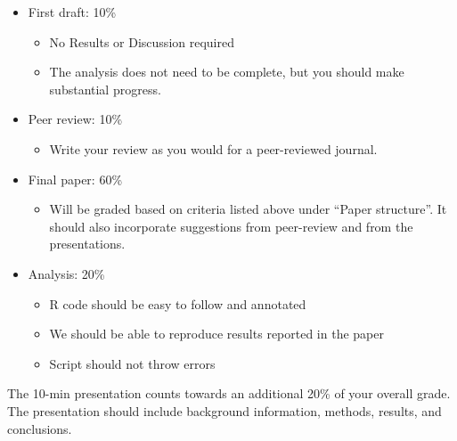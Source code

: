 \documentclass[12pt]{article}
\begin{document}
\begin{itemize}
  \item First draft: 10\%
    \begin{itemize}
      \item No Results or Discussion required
      \item The analysis does not need to be complete, but you should make substantial progress.
    \end{itemize}
  \item Peer review: 10\%
    \begin{itemize}
      \item Write your review as you would for a peer-reviewed journal.
    \end{itemize}
  \item Final paper: 60\%
    \begin{itemize}
      \item Will be graded based on criteria listed above under
        ``Paper structure''. It should also incorporate suggestions from
        peer-review and from the presentations.
    \end{itemize}
  \item Analysis: 20\%
    \begin{itemize}
      \item R code should be easy to follow and annotated
      \item We should be able to reproduce results reported in the paper
      \item Script should not throw errors
    \end{itemize}
\end{itemize}

The 10-min presentation counts towards an additional 20\% of your
overall grade. The presentation should include background information,
methods, results, and conclusions.   
\end{document}
